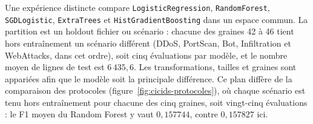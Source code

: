 
Une expérience distincte compare \texttt{LogisticRegression}, \texttt{RandomForest}, \texttt{SGDLogistic}, \texttt{ExtraTrees} et \texttt{HistGradientBoosting} dans un espace commun. La partition est un holdout fichier ou scénario : chacune des graines 42 à 46 tient hors entraînement un scénario différent (DDoS, PortScan, Bot, Infiltration et WebAttacks, dans cet ordre), soit cinq évaluations par modèle, et le nombre moyen de lignes de test est $6\,435{,}6$. Les transformations, tailles et graines sont appariées afin que le modèle soit la principale différence. Ce plan diffère de la comparaison des protocoles (figure~\ref{fig:cicids-protocoles}), où chaque scénario est tenu hors entraînement pour chacune des cinq graines, soit vingt-cinq évaluations : le F1 moyen du Random Forest y vaut $0{,}157744$, contre $0{,}157827$ ici.

\caption{Candidats CICIDS2017 sur holdout fichier/scénario, une évaluation par graine.}
